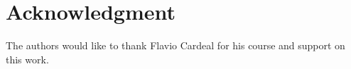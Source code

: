 \documentclass[10pt, conference]{IEEEtran}
\begin{document}
	\section*{Acknowledgment}
	The authors would like to thank Flavio Cardeal for his course and support on this work.
	
	
	
	
	
\end{document}
